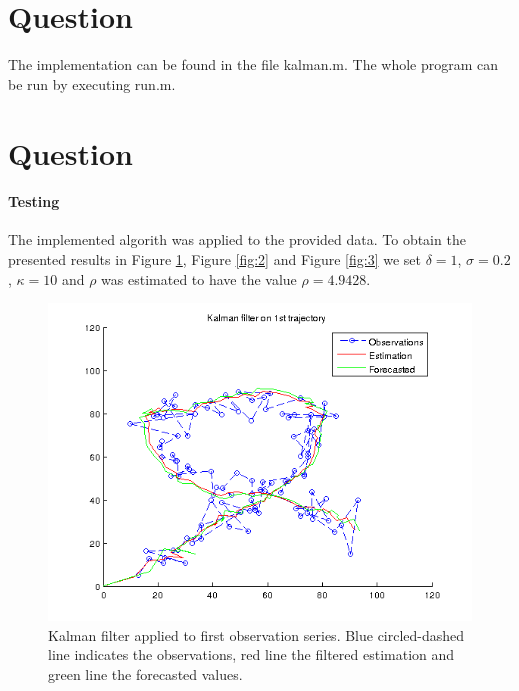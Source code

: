 \documentclass[a4paper, 12pt, titlepage]{article}
\begin{document}
\section{Question}

The implementation can be found in the file kalman.m.
The whole program can be run by executing run.m.

\section{Question}

\paragraph{Testing}

The implemented algorith was applied to the provided data. To obtain the presented results in Figure \ref{fig:1}, Figure \ref{fig:2} and Figure \ref{fig:3} we set $\delta=1$, $\sigma=0.2$, $\kappa=10$ and $\rho$ was estimated to have the value $\rho=4.9428$.

\begin{figure}
	\includegraphics[width=15cm]{images/1trajectory.png}
	\caption{Kalman filter applied to first observation series. Blue circled-dashed line indicates the observations, red line the filtered estimation and green line the forecasted values.}
	\label{fig:1}
\end{figure}
\end{document}
